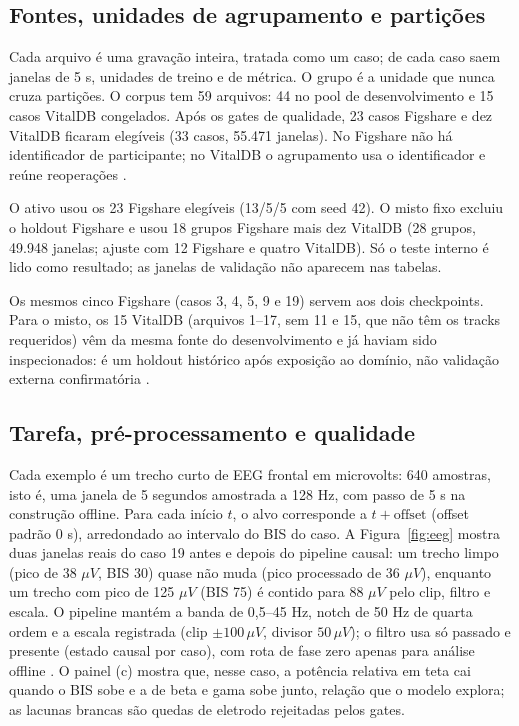 \documentclass[12pt]{article}
\begin{document}
\subsection{Fontes, unidades de agrupamento e partições}

Cada arquivo é uma gravação inteira, tratada como um caso; de cada caso saem janelas de 5 s, unidades de treino e de métrica. O grupo é a unidade que nunca cruza partições. O corpus tem 59 arquivos: 44 no pool de desenvolvimento e 15 casos VitalDB congelados. Após os gates de qualidade, 23 casos Figshare e dez VitalDB ficaram elegíveis (33 casos, 55.471 janelas). No Figshare não há identificador de participante; no VitalDB o agrupamento usa o identificador e reúne reoperações \cite{ma2017,lee2022}.

O ativo usou os 23 Figshare elegíveis (13/5/5 com seed 42). O misto fixo excluiu o holdout Figshare e usou 18 grupos Figshare mais dez VitalDB (28 grupos, 49.948 janelas; ajuste com 12 Figshare e quatro VitalDB). Só o teste interno é lido como resultado; as janelas de validação não aparecem nas tabelas.

Os mesmos cinco Figshare (casos 3, 4, 5, 9 e 19) servem aos dois checkpoints. Para o misto, os 15 VitalDB (arquivos 1--17, sem 11 e 15, que não têm os tracks requeridos) vêm da mesma fonte do desenvolvimento e já haviam sido inspecionados: é um holdout histórico após exposição ao domínio, não validação externa confirmatória \cite{tripodai}.

\subsection{Tarefa, pré-processamento e qualidade}

Cada exemplo é um trecho curto de EEG frontal em microvolts: 640 amostras, isto é, uma janela de 5 segundos amostrada a 128 Hz, com passo de 5 s na construção offline. Para cada início $t$, o alvo corresponde a $t+\mathrm{offset}$ (offset padrão 0 s), arredondado ao intervalo do BIS do caso. A Figura~\ref{fig:eeg} mostra duas janelas reais do caso 19 antes e depois do pipeline causal: um trecho limpo (pico de 38 $\mu V$, BIS 30) quase não muda (pico processado de 36 $\mu V$), enquanto um trecho com pico de 125 $\mu V$ (BIS 75) é contido para 88 $\mu V$ pelo clip, filtro e escala. O pipeline mantém a banda de 0,5--45 Hz, notch de 50 Hz de quarta ordem e a escala registrada (clip $\pm100\,\mu V$, divisor $50\,\mu V$); o filtro usa só passado e presente (estado causal por caso), com rota de fase zero apenas para análise offline \cite{ma2017,nsugbe2022}. O painel (c) mostra que, nesse caso, a potência relativa em teta cai quando o BIS sobe e a de beta e gama sobe junto, relação que o modelo explora; as lacunas brancas são quedas de eletrodo rejeitadas pelos gates.
\end{document}
